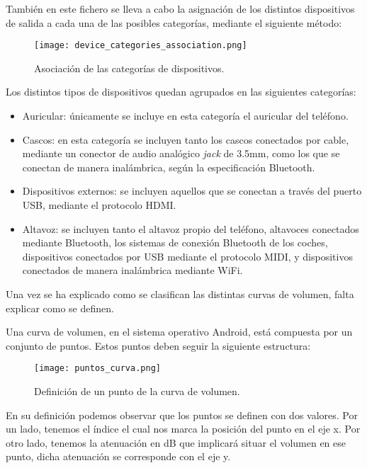 También en este fichero se lleva a cabo la asignación de los distintos dispositivos de salida a cada una de las posibles categorías, mediante el siguiente método:

\begin{figure}[H]
	\centering
	\texttt{[image: device\_categories\_association.png]}
	\caption{Asociación de las categorías de dispositivos.}
	\label{fig:device_categories_association}
\end{figure}

Los distintos tipos de dispositivos quedan agrupados en las siguientes categorías:

\begin{itemize}
	\item{Auricular: únicamente se incluye en esta categoría el auricular del teléfono.}
	\item{Cascos: en esta categoría se incluyen tanto los cascos conectados por cable, mediante un conector de audio analógico \textit{jack} de 3.5mm, como los que se conectan de manera inalámbrica, según la especificación Bluetooth.}
	\item{Dispositivos externos: se incluyen aquellos que se conectan a través del puerto \gls{USB}, mediante el protocolo \gls{HDMI}.}
	\item{Altavoz: se incluyen tanto el altavoz propio del teléfono, altavoces conectados mediante Bluetooth, los sistemas de conexión Bluetooth de los coches, dispositivos conectados por \gls{USB} mediante el protocolo \gls{MIDI}, y dispositivos conectados de manera inalámbrica mediante \gls{WiFi}.}
\end{itemize}

Una vez se ha explicado como se clasifican las distintas curvas de volumen, falta explicar como se definen.

Una curva de volumen, en el sistema operativo Android, está compuesta por un conjunto de puntos. Estos puntos deben seguir la siguiente estructura:

\begin{figure}[H]
	\centering
	\texttt{[image: puntos\_curva.png]}
	\caption{Definición de un punto de la curva de volumen.}
	\label{fig:puntos_curva}
\end{figure}

En su definición podemos observar que los puntos se definen con dos valores. Por un lado, tenemos el índice el cual nos marca la posición del punto en el eje x. Por otro lado, tenemos la atenuación en \gls{dB} que implicará situar el volumen en ese punto, dicha atenuación se corresponde con el eje y.

